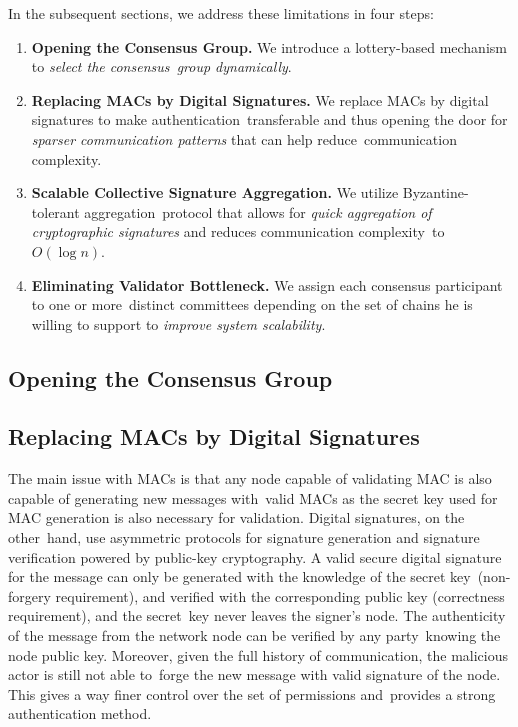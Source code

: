 In the subsequent sections, we address these limitations in four steps:
\begin{enumerate}
    \item \textbf{Opening the Consensus Group.} We introduce a lottery-based mechanism to \emph{select the consensus\
        group dynamically}.
    \item \textbf{Replacing MACs by Digital Signatures.} We replace MACs by digital signatures to make authentication\
    transferable and thus opening the door for \emph{sparser communication patterns} that can help reduce\
    communication complexity.
    \item \textbf{Scalable Collective Signature Aggregation.} We utilize Byzantine-tolerant aggregation\
    protocol that allows for \emph{quick aggregation of cryptographic signatures} and reduces communication complexity\
    to $O(\log{n})$.
    \item \textbf{Eliminating Validator Bottleneck.} We assign each consensus participant to one or more\
    distinct committees depending on the set of chains he is willing to support to \emph{improve system scalability}.
\end{enumerate}

\subsection{Opening the Consensus Group}\label{subsec:opening-consensus-group}


\subsection{Replacing MACs by Digital Signatures}\label{subsec:replacing-macs-by-digital-signatures}

The main issue with MACs is that any node capable of validating MAC is also capable of generating new messages with\
valid MACs as the secret key used for MAC generation is also necessary for validation.
Digital signatures, on the other\
hand, use asymmetric protocols for signature generation and signature verification powered by public-key cryptography.
A valid secure digital signature for the message can only be generated with the knowledge of the secret key\
(non-forgery requirement), and verified with the corresponding public key (correctness requirement), and the secret\
key never leaves the signer's node.
The authenticity of the message from the network node can be verified by any party\
knowing the node public key.
Moreover, given the full history of communication, the malicious actor is still not able to\
forge the new message with valid signature of the node.
This gives a way finer control over the set of permissions and\
provides a strong authentication method.

